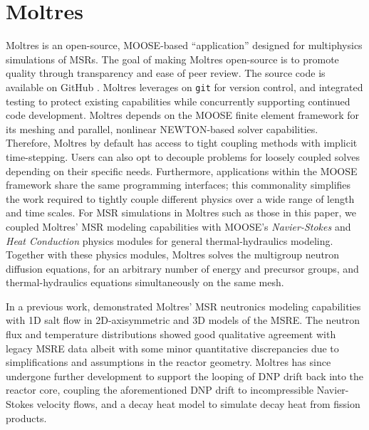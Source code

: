 \section{Moltres} \label{sec:moltres}


Moltres \citep{lindsay_introduction_2018} is an open-source, \gls{MOOSE}-based
``application'' designed for multiphysics simulations of \glspl{MSR}. The goal
of making Moltres open-source is to promote quality through transparency and
ease of peer review. The source code \citep{lindsay_moltres_2017} is available
on GitHub \citep{github_build_2017}. Moltres leverages on \texttt{git} for
version control, and integrated testing to protect existing capabilities while
concurrently supporting continued code development. Moltres depends on the
\gls{MOOSE} finite element framework for its meshing and parallel, nonlinear
NEWTON-based solver capabilities. Therefore,
Moltres by default has access to tight coupling methods with implicit
time-stepping. Users can also opt to decouple problems for loosely coupled
solves depending on their specific needs. Furthermore, applications within the
\gls{MOOSE} framework share the same programming
interfaces; this commonality simplifies the work required to tightly couple
different physics over a wide range of length and time scales. For \gls{MSR}
simulations in Moltres such as those in this paper, we coupled Moltres'
\gls{MSR} modeling capabilities with \gls{MOOSE}'s \textit{Navier-Stokes} and
\textit{Heat Conduction} physics modules \citep{peterson_overview_2017} for
general thermal-hydraulics modeling. Together with these physics modules,
Moltres solves the multigroup neutron diffusion equations, for an arbitrary
number of energy and precursor groups, and thermal-hydraulics equations
simultaneously on the same mesh.

In a previous work, \cite{lindsay_introduction_2018}
demonstrated Moltres' \gls{MSR} neutronics modeling capabilities with 1D salt
flow in 2D-axisymmetric and 3D models of the \gls{MSRE}. The neutron flux and
temperature distributions showed good qualitative agreement with legacy
\gls{MSRE} data albeit with some minor quantitative discrepancies due to
simplifications and assumptions in the reactor geometry. Moltres has
since undergone further development to support the looping of \gls{DNP} drift
back into the reactor core, coupling the aforementioned \gls{DNP} drift
to incompressible Navier-Stokes velocity flows, and a decay heat model to
simulate decay heat from fission products.

